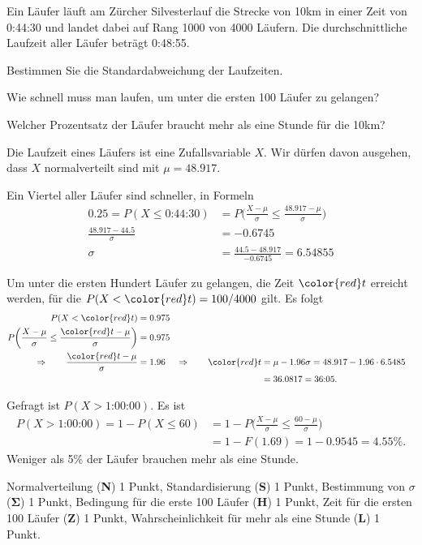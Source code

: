 Ein Läufer läuft am Zürcher Silvesterlauf die Strecke von 10km in
einer Zeit von 0:44:30 und landet dabei auf Rang 1000 von 4000 Läufern.
Die durchschnittliche Laufzeit aller Läufer beträgt 0:48:55.
\begin{teilaufgaben}
\item 
Bestimmen Sie die Standardabweichung der Laufzeiten.
\item
Wie schnell muss man laufen, um unter die ersten 100 Läufer zu gelangen?
\item
Welcher Prozentsatz der Läufer braucht mehr als eine Stunde für die 10km?
\end{teilaufgaben}


\begin{loesung}
Die Laufzeit eines Läufers ist eine Zufallsvariable $X$.
Wir dürfen davon ausgehen, dass $X$ normalverteilt sind mit $\mu=48.917$.
\begin{teilaufgaben}
\item 
Ein Viertel aller Läufer sind schneller, in Formeln
\begin{align*}
0.25
=
P(X \le \text{0:44:30})
&=
P\biggl(
\frac{X-\mu}{\sigma} \le \frac{48.917 - \mu}{\sigma}
\biggr)
\\
\frac{48.917 - 44.5}{\sigma}
&=
-0.6745
\\
\sigma
&=
\frac{44.5- 48.917}{-0.6745}
=
6.54855
\end{align*}
\item 
Um unter die ersten Hundert Läufer zu gelangen, die Zeit $\color{red}t$
erreicht werden,
für die $P(X<{\color{red}t})=100/4000$ gilt.
Es folgt
\begin{align*}
P(X<{\color{red}t})
&=
0.975
\\
P\biggl(\frac{X-\mu}{\sigma}\le\frac{{\color{red}t}-\mu}{\sigma}\biggr)
&=
0.975
\\
\Rightarrow\qquad
\frac{{\color{red}t}-\mu}{\sigma}
&=
1.96
&
\Rightarrow\qquad
{\color{red}t}&=\mu - 1.96\sigma
=
48.917 - 1.96\cdot 6.5485
\\
&&&=
36.0817
=
\text{36:05}.
\end{align*}
\item
Gefragt ist $P(X>\text{1:00:00})$.
Es ist
\begin{align*}
P(X>\text{1:00:00})
=1-P(X\le 60)
&=
1- P\biggl(\frac{X-\mu}{\sigma} \le \frac{60-\mu}{\sigma}\biggr)
\\
&=
1 - F(1.69)
=
1-0.9545=4.55\%.
\end{align*}
Weniger als 5\% der Läufer brauchen mehr als eine Stunde.
\qedhere
\end{teilaufgaben}
\end{loesung}

\begin{bewertung}
Normalverteilung ({\bf N}) 1 Punkt,
Standardisierung ({\bf S}) 1 Punkt,
Bestimmung von $\sigma$ ($\mathbf{\Sigma}$) 1 Punkt,
Bedingung für die erste 100 Läufer ({\bf H}) 1 Punkt,
Zeit für die ersten 100 Läufer ({\bf Z}) 1 Punkt,
Wahrscheinlichkeit für mehr als eine Stunde ({\bf L}) 1 Punkt.
\end{bewertung}



